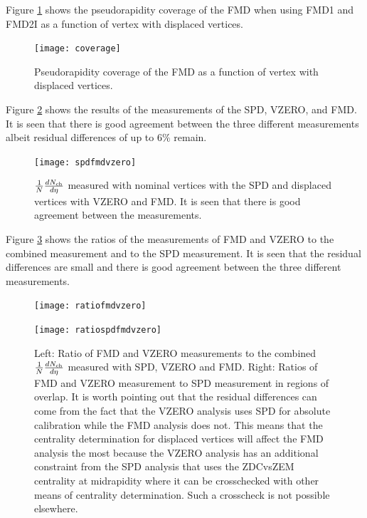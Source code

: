 \documentclass[11pt]{article}
\newcommand{\mult}[1][]{\ensuremath N_{\text{ch}#1}}
\newcommand{\dndeta}[1][]{{\ensuremath%
    \ifx|#1|\else\left.\fi%
    \frac{1}{N}\frac{d\mult{}}{d\eta}%
    \ifx|#1|\else\right|_{#1}\fi%
}}
\begin{document}
Figure \ref{coverage} shows the pseudorapidity coverage of the FMD when using FMD1
and FMD2I as a function of vertex with displaced vertices. 
\begin{figure}[hbp]
  \centering
  \texttt{[image: coverage]}
  \caption{Pseudorapidity coverage of the FMD as a function of vertex
    with displaced vertices.}
  \label{coverage}
\end{figure} 

Figure \ref{spdfmdvzero} shows the results of the measurements of the
SPD, VZERO, and FMD. It is
seen that there is good
agreement between the three different measurements albeit residual
differences of up to $6 \%$ remain.
\begin{figure}[hbp]
   \centering
  \texttt{[image: spdfmdvzero]}
  \caption{$\dndeta$ measured with nominal vertices with the SPD and
    displaced vertices with VZERO and FMD. It is seen that there is
    good agreement between the measurements.}
  \label{spdfmdvzero}
\end{figure} 

Figure \ref{ratiofmdvzero} shows the ratios of the measurements of FMD and
VZERO to the combined measurement and to the SPD measurement. It is
seen that the residual differences are small and there is good
agreement between the three different measurements.
\begin{figure}
  \centering
  \begin{minipage}{0.5\linewidth}
  \centering
  \texttt{[image: ratiofmdvzero]}
  \end{minipage}%
  \begin{minipage}{0.5\linewidth}
  \centering
  \texttt{[image: ratiospdfmdvzero]}
\end{minipage}%
  \caption{Left: Ratio of FMD and VZERO measurements to the combined
    $\dndeta$ measured with SPD, VZERO and FMD. Right: Ratios of FMD
    and VZERO measurement to SPD measurement in regions of
    overlap. It is worth pointing out that the residual differences
    can come from the fact that the VZERO analysis uses SPD for
    absolute calibration while the FMD analysis does not. This means that the
    centrality determination for displaced vertices will affect the
    FMD analysis the most because the VZERO analysis has an additional
  constraint from the SPD analysis that uses the ZDCvsZEM centrality
  at midrapidity where it can be crosschecked with other means of
  centrality determination. Such a crosscheck is not possible elsewhere.}
  \label{ratiofmdvzero}
\end{figure} 
\end{document}
